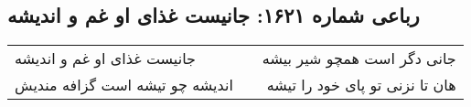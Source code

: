\begin{center}
\section*{رباعی شماره ۱۶۲۱: جانیست غذای او غم و اندیشه}
\label{sec:1621}
\begin{longtable}{l p{0.5cm} r}
جانیست غذای او غم و اندیشه
&&
جانی دگر است همچو شیر بیشه
\\
اندیشه چو تیشه است گزافه مندیش
&&
هان تا نزنی تو پای خود را تیشه
\\
\end{longtable}
\end{center}
